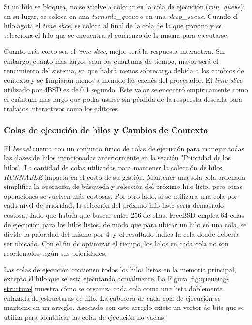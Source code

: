 Si un hilo se bloquea, no se vuelve a colocar en la cola de ejecución (\textit{run\_queue}); en su lugar, se coloca en una \textit{turnstile\_queue} o en una \textit{sleep\_queue}. Cuando el hilo agota el \textit{time slice}, se coloca al final de la cola de la que provino y se selecciona el hilo que se encuentra al comienzo de la misma para ejecutarse.\par

Cuanto más corto sea el \textit{time slice}, mejor será la respuesta interactiva. Sin embargo, cuanto más largos sean los cuántums de tiempo, mayor será el rendimiento del sistema, ya que habrá menos sobrecarga debida a los cambios de contexto y se limpiarán menos a menudo las cachés del procesador. El \textit{time slice} utilizado por 4BSD es de 0.1 segundo. Este valor se encontró empíricamente como el cuántum más largo que podía usarse sin pérdida de la respuesta deseada para trabajos interactivos como los editores.\par

\subsubsection{Colas de ejecución de hilos y Cambios de Contexto}

El \textit{kernel} cuenta con un conjunto único de colas de ejecución para manejar todas las clases de hilos mencionadas anteriormente en la sección "Prioridad de los hilos". La cantidad de colas utilizadas para mantener la colección de hilos \textit{RUNNABLE} impacta en el costo de su gestión. Mantener una sola cola ordenada simplifica la operación de búsqueda y selección del próximo hilo listo, pero otras operaciones se vuelven más costosas. Por otro lado, si se utilizara una cola por cada nivel de prioridad, la selección del próximo hilo listo sería demasiado costosa, dado que habría que buscar entre 256 de ellas. FreeBSD emplea 64 colas de ejecución para los hilos listos, de modo que para ubicar un hilo en una cola, se divide la prioridad del mismo por 4, y el resultado indica la cola donde debería ser ubicado. Con el fin de optimizar el tiempo, los hilos en cada cola no son reordenados según sus prioridades.\par

Las colas de ejecución contienen todos los hilos listos en la memoria principal, excepto el hilo que se está ejecutando actualmente. La Figura \ref{fig:queueing-structure} muestra cómo se organiza cada cola como una lista doblemente enlazada de estructuras de hilo. La cabecera de cada cola de ejecución se mantiene en un arreglo. Asociado con este arreglo existe un vector de bits que se utiliza para identificar las colas de ejecución no vacías.\par

